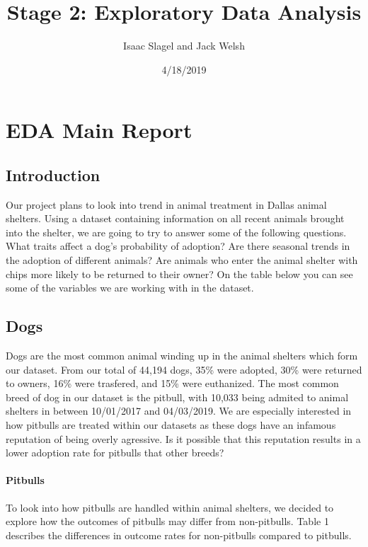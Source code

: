 \documentclass[]{article}
\title{Stage 2: Exploratory Data Analysis}
\author{Isaac Slagel and Jack Welsh}
\date{4/18/2019}
\let\oldparagraph\paragraph
\renewcommand{\paragraph}[1]{\oldparagraph{#1}\mbox{}}
\begin{document}
\maketitle

\section{EDA Main Report}\label{eda-main-report}

\subsection{Introduction}\label{introduction}

Our project plans to look into trend in animal treatment in Dallas
animal shelters. Using a dataset containing information on all recent
animals brought into the shelter, we are going to try to answer some of
the following questions. What traits affect a dog's probability of
adoption? Are there seasonal trends in the adoption of different
animals? Are animals who enter the animal shelter with chips more likely
to be returned to their owner? On the table below you can see some of
the variables we are working with in the dataset.

\subsection{Dogs}\label{dogs}

Dogs are the most common animal winding up in the animal shelters which
form our dataset. From our total of 44,194 dogs, 35\% were adopted, 30\%
were returned to owners, 16\% were trasfered, and 15\% were euthanized.
The most common breed of dog in our dataset is the pitbull, with 10,033
being admited to animal shelters in between 10/01/2017 and 04/03/2019.
We are especially interested in how pitbulls are treated within our
datasets as these dogs have an infamous reputation of being overly
agressive. Is it possible that this reputation results in a lower
adoption rate for pitbulls that other breeds?

\paragraph{Pitbulls}\label{pitbulls}

To look into how pitbulls are handled within animal shelters, we decided
to explore how the outcomes of pitbulls may differ from non-pitbulls.
Table 1 describes the differences in outcome rates for non-pitbulls
compared to pitbulls.
\end{document}
